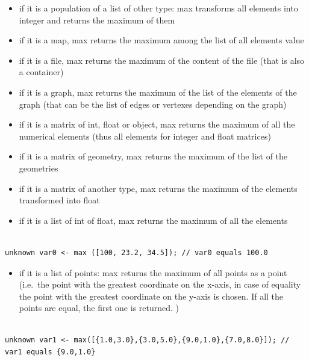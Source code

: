 \documentclass[]{book}
\providecommand{\tightlist}{%
  \setlength{\itemsep}{0pt}\setlength{\parskip}{0pt}}
\theoremstyle{definition}
\theoremstyle{definition}
\theoremstyle{definition}
\theoremstyle{remark}
\begin{document}
\begin{itemize}
\tightlist
\item
  if it is a population of a list of other type: max transforms all
  elements into integer and returns the maximum of them\\
\item
  if it is a map, max returns the maximum among the list of all elements
  value\\
\item
  if it is a file, max returns the maximum of the content of the file
  (that is also a container)\\
\item
  if it is a graph, max returns the maximum of the list of the elements
  of the graph (that can be the list of edges or vertexes depending on
  the graph)\\
\item
  if it is a matrix of int, float or object, max returns the maximum of
  all the numerical elements (thus all elements for integer and float
  matrices)\\
\item
  if it is a matrix of geometry, max returns the maximum of the list of
  the geometries\\
\item
  if it is a matrix of another type, max returns the maximum of the
  elements transformed into float\\
\item
  if it is a list of int of float, max returns the maximum of all the
  elements
\end{itemize}

\begin{verbatim}
 
unknown var0 <- max ([100, 23.2, 34.5]); // var0 equals 100.0
\end{verbatim}

\begin{itemize}
\tightlist
\item
  if it is a list of points: max returns the maximum of all points as a
  point (i.e.~the point with the greatest coordinate on the x-axis, in
  case of equality the point with the greatest coordinate on the y-axis
  is chosen. If all the points are equal, the first one is returned. )
\end{itemize}

\begin{verbatim}
 
unknown var1 <- max([{1.0,3.0},{3.0,5.0},{9.0,1.0},{7.0,8.0}]); // var1 equals {9.0,1.0}
\end{verbatim}
\end{document}
